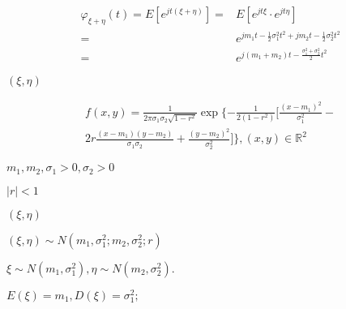 \begin{preview}
\setcounter{equation}{0}%
\begin{align}
  \varphi_{\xi+\eta}(t) = E[e^{jt(\xi+\eta)}] = &E[e^{jt\xi} \cdot e^{jt\eta}] \\
=&e^{jm_1t - \frac{1}{2}\sigma_1^2t^2 + jm_2t - \frac{1}{2}\sigma_2^2t^2}\\
=&e^{j(m_1+m_2)t - \frac{\sigma_1^2+\sigma_2^2}{2}t^2}
\end{align}

\end{preview}

\begin{preview}
\setcounter{equation}{0}%
\((\xi, \eta)\)
\end{preview}

\begin{preview}
\setcounter{equation}{0}%
\begin{align}
  f(x, y) = \frac{1}{2\pi \sigma_1 \sigma_2 \sqrt{1 - r^2}} \exp\{-\frac{1}{2(1-r^2)}[\frac{(x-m_1)^2}{\sigma_1^2} - \\2r \frac{(x-m_1)(y-m_2)}{\sigma_1 \sigma_2} + \frac{(y - m_2)^2}{\sigma_2^2}]\}, (x, y) \in \mathbb{R}^2
\end{align}

\end{preview}

\begin{preview}
\setcounter{equation}{0}%
\(m_1, m_2, \sigma_1 > 0, \sigma_2 > 0\)
\end{preview}

\begin{preview}
\setcounter{equation}{0}%
\(\vert r \vert < 1\)
\end{preview}

\begin{preview}
\setcounter{equation}{0}%
\((\xi, \eta)\)
\end{preview}

\begin{preview}
\setcounter{equation}{0}%
\((\xi, \eta) \sim N(m_1, \sigma_1^2; m_2, \sigma_2^2;r)\)
\end{preview}

\begin{preview}
\setcounter{equation}{0}%
\(\xi \sim N(m_1, \sigma_1^2), \eta \sim N(m_2, \sigma_2^2).\)
\end{preview}

\begin{preview}
\setcounter{equation}{0}%
\(E(\xi) = m_1, D(\xi) = \sigma_1^2;\)
\end{preview}

